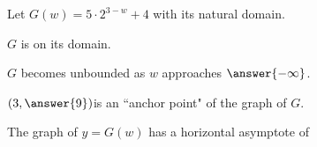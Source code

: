 \documentclass{ximera}
\author{Lee Wayand}
\begin{document}
\begin{exercise}




Let $G(w) = 5 \cdot 2^{3-w} + 4$ with its natural domain.


\begin{question}


$G$ is  on its domain. \\


\end{question}







\begin{question}


$G$ becomes unbounded as $w$ approaches $\answer{-\infty}$.


\end{question}





\begin{question}


$\left( 3, \answer{9} \right) $is an ``anchor point" of the graph of $G$. \\


\end{question}








\begin{question}


The graph of $y=G(w)$ has a horizontal asymptote of

\begin{multipleChoice}
\end{multipleChoice}


\end{question}








\end{exercise}
\end{document}
